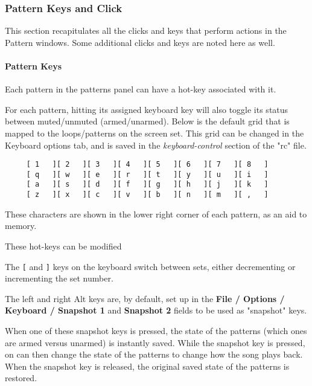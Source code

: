 \subsubsection{Pattern Keys and Click}
\label{subsubsec:seq24_patterns_pattern_keys_and_clicks}

   This section recapitulates all the clicks and keys that perform actions
   in the Pattern windows.  Some additional clicks and keys are noted here
   as well.

\paragraph{Pattern Keys}
\label{paragraph:seq24_patterns_pattern_keys}

   Each pattern in the patterns panel can have a hot-key associated with it.

   For each pattern, hitting its assigned keyboard key will
   also toggle its status between muted/unmuted (armed/unarmed).
   Below is the default grid that is
   mapped to the loops/patterns on the screen set.
   This grid can be changed in the Keyboard options tab, and is
   saved in the \textsl{keyboard-control} section of the
   "rc" file.

   \begin{verbatim}
     [ 1   ][ 2   ][ 3   ][ 4   ][ 5   ][ 6   ][ 7   ][ 8   ]
     [ q   ][ w   ][ e   ][ r   ][ t   ][ y   ][ u   ][ i   ]
     [ a   ][ s   ][ d   ][ f   ][ g   ][ h   ][ j   ][ k   ]
     [ z   ][ x   ][ c   ][ v   ][ b   ][ n   ][ m   ][ ,   ]
   \end{verbatim}

   These characters are shown in the lower right corner of each
   pattern, as an aid to memory.

   These hot-keys can be modified

   \index{keys![}
   The \texttt{[} and
   \index{keys!]}
   \texttt{]} keys on the keyboard
   switch between sets, either decrementing or incrementing the set number.

   The left and right Alt keys are, by default, set up in the
   \textbf{File / Options / Keyboard / Snapshot 1} and
   \textbf{Snapshot 2} fields to be used as "snapshot" keys.

   When one of these snapshot keys is pressed, the state of the patterns
   (which ones are armed versus unarmed) is instantly saved.  While the
   snapshot key is pressed, on can then change the state of the patterns to
   change how the song plays back.  When the snapshot key is released, the
   original saved state of the patterns is restored.

